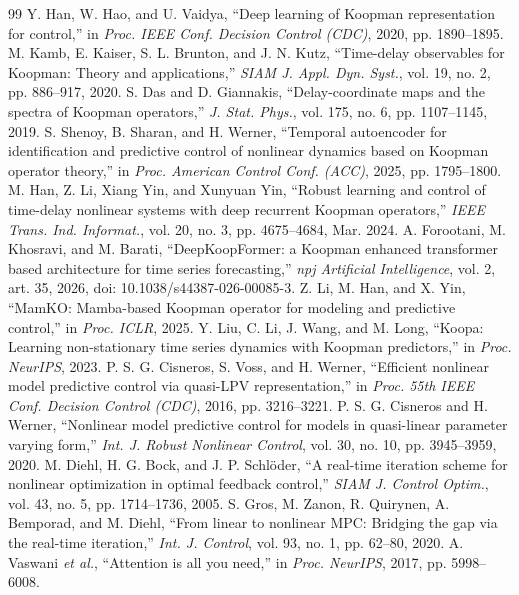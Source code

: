 \documentclass[journal]{IEEEtran}
\theoremstyle{plain}
\theoremstyle{definition}
\begin{document}
\begin{thebibliography}{99}
Y. Han, W. Hao, and U. Vaidya, ``Deep learning of Koopman representation for control,'' in \emph{Proc. IEEE Conf. Decision Control (CDC)}, 2020, pp. 1890--1895.
M. Kamb, E. Kaiser, S. L. Brunton, and J. N. Kutz, ``Time-delay observables for Koopman: Theory and applications,'' \emph{SIAM J. Appl. Dyn. Syst.}, vol. 19, no. 2, pp. 886--917, 2020.
S. Das and D. Giannakis, ``Delay-coordinate maps and the spectra of Koopman operators,'' \emph{J. Stat. Phys.}, vol. 175, no. 6, pp. 1107--1145, 2019.
S. Shenoy, B. Sharan, and H. Werner, ``Temporal autoencoder for identification and predictive control of nonlinear dynamics based on Koopman operator theory,'' in \emph{Proc. American Control Conf. (ACC)}, 2025, pp. 1795--1800.
M. Han, Z. Li, Xiang Yin, and Xunyuan Yin, ``Robust learning and control of time-delay nonlinear systems with deep recurrent Koopman operators,'' \emph{IEEE Trans. Ind. Informat.}, vol. 20, no. 3, pp. 4675--4684, Mar. 2024.
A. Forootani, M. Khosravi, and M. Barati, ``DeepKoopFormer: a Koopman enhanced transformer based architecture for time series forecasting,'' \emph{npj Artificial Intelligence}, vol. 2, art. 35, 2026, doi: 10.1038/s44387-026-00085-3.
Z. Li, M. Han, and X. Yin, ``MamKO: Mamba-based Koopman operator for modeling and predictive control,'' in \emph{Proc. ICLR}, 2025.
Y. Liu, C. Li, J. Wang, and M. Long, ``Koopa: Learning non-stationary time series dynamics with Koopman predictors,'' in \emph{Proc. NeurIPS}, 2023.
P. S. G. Cisneros, S. Voss, and H. Werner, ``Efficient nonlinear model predictive control via quasi-LPV representation,'' in \emph{Proc. 55th IEEE Conf. Decision Control (CDC)}, 2016, pp. 3216--3221.
P. S. G. Cisneros and H. Werner, ``Nonlinear model predictive control for models in quasi-linear parameter varying form,'' \emph{Int. J. Robust Nonlinear Control}, vol. 30, no. 10, pp. 3945--3959, 2020.
M. Diehl, H. G. Bock, and J. P. Schl\"oder, ``A real-time iteration scheme for nonlinear optimization in optimal feedback control,'' \emph{SIAM J. Control Optim.}, vol. 43, no. 5, pp. 1714--1736, 2005.
S. Gros, M. Zanon, R. Quirynen, A. Bemporad, and M. Diehl, ``From linear to nonlinear MPC: Bridging the gap via the real-time iteration,'' \emph{Int. J. Control}, vol. 93, no. 1, pp. 62--80, 2020.
A. Vaswani \emph{et al.}, ``Attention is all you need,'' in \emph{Proc. NeurIPS}, 2017, pp. 5998--6008.
\end{thebibliography}
\end{document}
